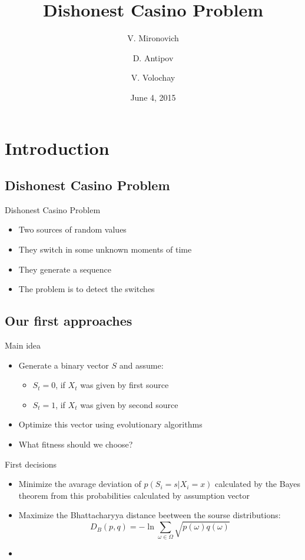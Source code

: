 \documentclass[hyperref=unicode,graphics=pdflatex,13pt]{beamer}
\title[Dishonest Casino Problem\ldots]{Dishonest Casino Problem
}
\author[\mbox{V. Mironovich, D. Antipov, V. Volochay}]
{V. Mironovich \and D. Antipov \and V. Volochay}
\institute{\inst{1}ITMO University
}
\date[June 4]{June 4, 2015}
\begin{document}
\begin{frame}
  \titlepage
\end{frame}

\begin{frame}
  \tableofcontents
\end{frame}

\section{Introduction}
\subsection{Dishonest Casino Problem}
\begin{frame}{Dishonest Casino Problem}
\begin{itemize}
   \item Two sources of random values
   \item They switch in some unknown moments of time
   \item They generate a sequence
   \item The problem is to detect the switches
\end{itemize}
\end{frame} 

\subsection{Our first approaches}
\begin{frame}{Main idea}
\begin{itemize}
   \item Generate a binary vector $S$ and assume:
   \begin{itemize}
   \item $S_t = 0$, if $X_t$ was given by first source
   \item $S_t = 1$, if $X_t$ was given by second source
   \end{itemize}
   \item Optimize this vector using evolutionary algorithms
   \item What fitness should we choose?
\end{itemize}
\end{frame}

\begin{frame}{First decisions}
\begin{itemize}
   \item Minimize the avarage deviation of $p(S_i=s | X_i = x)$ calculated by the Bayes theorem from this probabilities calculated by assumption vector
   \item Maximize the Bhattacharyya distance beetween the sourse distributions:
   $$D_B(p, q) = -\ln{\sum_{\omega \in \Omega} \sqrt{p(\omega)q(\omega)}}$$
   \item %
\end{itemize}
\end{frame}
\end{document}
